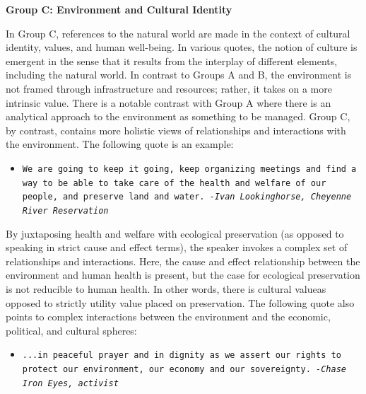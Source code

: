 \textbf{Group C: Environment and Cultural Identity}

In Group C, references to the natural world are made in the context of cultural identity, values, and human well-being. In various quotes, the notion of culture is emergent in the sense that it results from the interplay of different elements, including the natural world. In contrast to Groups A and B, the environment is not framed through infrastructure and resources; rather, it takes on a more intrinsic value. There is a notable contrast with Group A where there is an analytical approach to the environment as something to be managed. Group C, by contrast, contains more holistic views of relationships and interactions with the environment. The following quote is an example: 

\begin{footnotesize}
\begin{itemize}
\item[] \texttt{We are going to keep it going, keep organizing meetings and find a way to be able to take care of the health and welfare of our people, and preserve land and water.   \newline
\textit{-Ivan Lookinghorse, Cheyenne River Reservation}}
\end{itemize}
\end{footnotesize}

By juxtaposing health and welfare with ecological preservation (as opposed to speaking in strict cause and effect terms), the speaker invokes a complex set of relationships and interactions. Here, the cause and effect relationship between the environment and human health is present, but the case for ecological preservation is not reducible to human health. In other words, there is cultural value\textemdash as opposed to strictly utility value \textemdash placed on preservation. The following quote also points to complex interactions between the environment and the economic, political, and cultural spheres:

\begin{footnotesize}
\begin{itemize}
\item[] \texttt{...in peaceful prayer and in dignity as we assert our rights to protect our environment, our economy and our sovereignty.   \newline
\textit{-Chase Iron Eyes, activist}}
\end{itemize}
\end{footnotesize}

